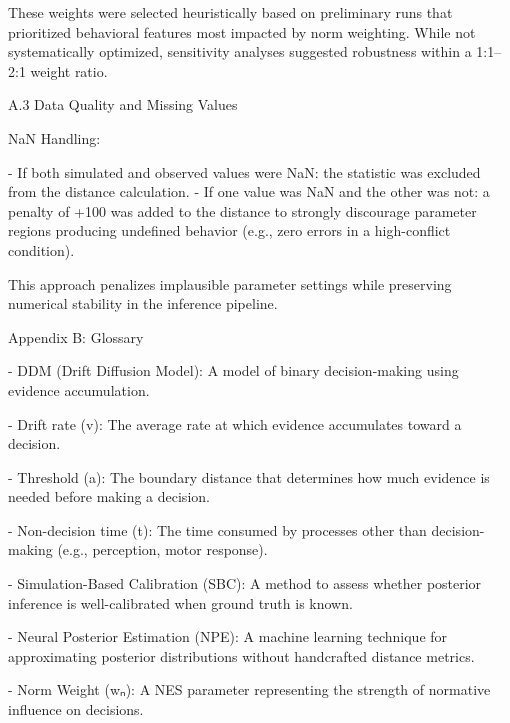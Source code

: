 These weights were selected heuristically based on preliminary runs that
prioritized behavioral features most impacted by norm weighting. While
not systematically optimized, sensitivity analyses suggested robustness
within a 1:1–2:1 weight ratio.

A.3 Data Quality and Missing Values

NaN Handling:

- If both simulated and observed values were NaN: the statistic was
  excluded from the distance calculation.
- If one value was NaN and the other was not: a penalty of +100 was
  added to the distance to strongly discourage parameter regions
  producing undefined behavior (e.g., zero errors in a high-conflict
  condition).

This approach penalizes implausible parameter settings while preserving
numerical stability in the inference pipeline.

Appendix B: Glossary

- DDM (Drift Diffusion Model): A model of binary decision-making using
  evidence accumulation.

- Drift rate (v): The average rate at which evidence accumulates toward
  a decision.

- Threshold (a): The boundary distance that determines how much evidence
  is needed before making a decision.

- Non-decision time (t): The time consumed by processes other than
  decision-making (e.g., perception, motor response).

- Simulation-Based Calibration (SBC): A method to assess whether
  posterior inference is well-calibrated when ground truth is known.

- Neural Posterior Estimation (NPE): A machine learning technique for
  approximating posterior distributions without handcrafted distance
  metrics.

- Norm Weight (wₙ): A NES parameter representing the strength of
  normative influence on decisions.
